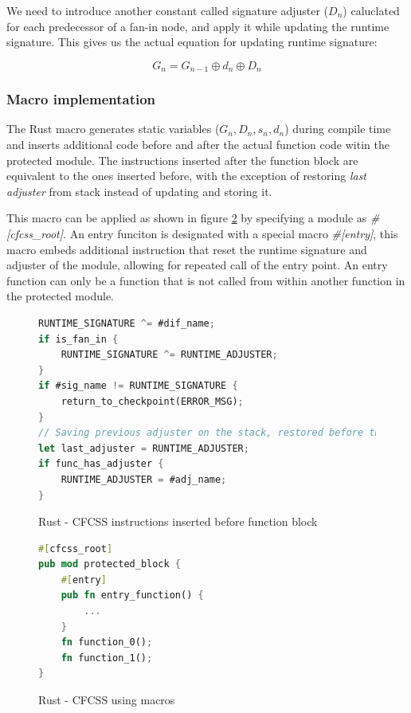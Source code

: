 \documentclass[12pt, letterpaper]{article}
\begin{document}
We need to introduce another constant called signature adjuster ({$D_n$}) caluclated for each predecessor of a fan-in node, and apply it while updating the runtime signature. This gives us the actual equation for updating runtime signature:

\[
G_n = G_{n-1} \oplus d_n \oplus D_n
\]

\subsubsection{Macro implementation}

The Rust macro generates static variables ({$G_n, D_n, s_n, d_n$}) during compile time and inserts additional code before and after the actual function code witin the protected module. The instructions inserted after the function block are equivalent to the ones inserted before, with the exception of restoring \textit{last adjuster} from stack instead of updating and storing it.

This macro can be applied as shown in figure \ref{fig:rust_cfcss_macro_example} by specifying a module as \textit{\#[cfcss\_root]}. An entry funciton is designated with a special macro \textit{\#[entry]}, this macro embeds additional instruction that reset the runtime signature and adjuster of the module, allowing for repeated call of the entry point. An entry function can only be a function that is not called from within another function in the protected module.

\begin{figure}
\begin{lstlisting}[language=Rust]
RUNTIME_SIGNATURE ^= #dif_name;
if is_fan_in {
    RUNTIME_SIGNATURE ^= RUNTIME_ADJUSTER;
}
if #sig_name != RUNTIME_SIGNATURE {
    return_to_checkpoint(ERROR_MSG);
}
// Saving previous adjuster on the stack, restored before the function returns
let last_adjuster = RUNTIME_ADJUSTER;
if func_has_adjuster {
    RUNTIME_ADJUSTER = #adj_name;
}
\end{lstlisting}
\caption{Rust - CFCSS instructions inserted before function block}
\label{fig:rust_cfcss_macro}
\end{figure}

\begin{figure}
\begin{lstlisting}[language=Rust]
#[cfcss_root]
pub mod protected_block {
    #[entry]
    pub fn entry_function() {
        ...
    }
    fn function_0();
    fn function_1();
}
\end{lstlisting}
\caption{Rust - CFCSS using macros}
\label{fig:rust_cfcss_macro_example}
\end{figure}
\end{document}
